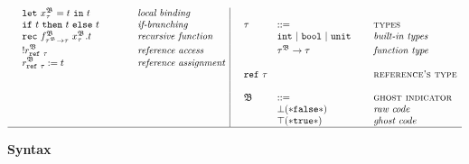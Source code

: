 \begin{figure}[H]
\begin{adjustwidth}{-3em}{-3em}
\begin{displaymath}
\begin{array}{ll@{\hspace*{-0.1cm}}
							 l@{\hspace*{1.5cm} }
							 l|@{\hspace*{0.5cm}}
							 llll}
  & \mathtt{let} ~ \gvar{x}{}{} = t~ \mathtt{in}~ t    
  & & \textit{local binding} 
  & & & & \\		
   								   
  & \mathtt{if}~t~\mathtt{then}~t~\mathtt{else}~t
  & & \textit{if-branching}    
  &  \tau & ::= 
  & & \textsc{types} \\ 
   		 								      								   
  &	\mathtt{rec}~\var{f}{\mf{B}}{\tarr{}{}{}}~
	\gvar{x}{}{}. t 
  & &  \textit{recursive function} &
  &  \mathtt{int}~ | ~\mathtt{bool}~ | ~\mathtt{unit}~  
  & & \textit{built-in types} \\ 
   	   		
   	   								      								   
  &  	\mathtt{!}\gref{r}{}{} 
  & &  \textit{reference access} &
  &     \tau^{\mathfrak{B}}  \rightarrow \tau  
  & & \textit{function type} \\    					
 	   
	&  	\gref{r}{}{} := t  
	& &  \textit{reference assignment} & \\
	
	& & & &		\mathtt{ref}~\tau  &
	& & \textsc{reference's type}  \\   
  
  & & & & \\  
   	
  & & & & \mathfrak{B} & ::= 
  & & \textsc{ghost indicator} \\
         
  & & & & &  \bot \mathtt{(* false *)} 
  & & \textit{raw code} \\ 
    
  & & & & &  \top \mathtt{(* true *)} 
  & & \textit{ghost code} \\ 
 
 \hline						   
  \end{array} 
\end{displaymath} 
\caption{ \textbf{\gml Syntax} \hfill}
\end{adjustwidth}
\end{figure}
%
%
%

